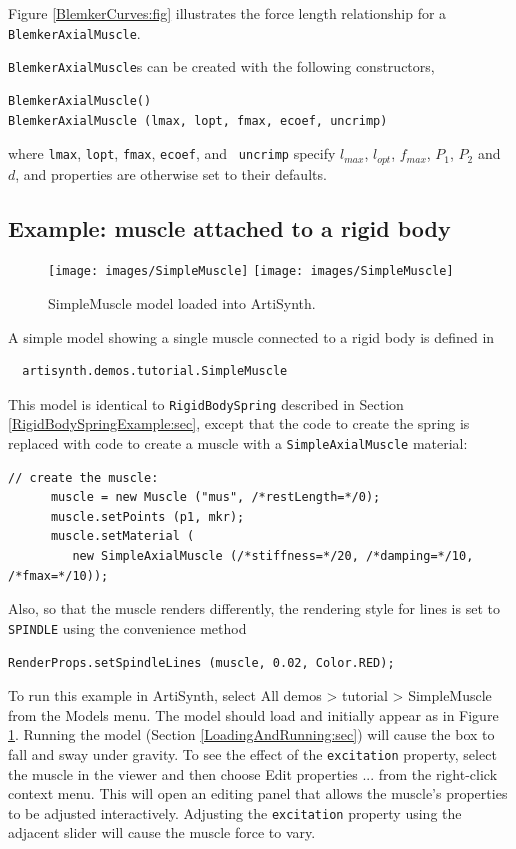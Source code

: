 Figure \ref{BlemkerCurves:fig} illustrates the force length relationship
for a {\tt BlemkerAxialMuscle}. 

{\tt BlemkerAxialMuscle}s can be created with the following 
constructors, 
\begin{lstlisting}[]
BlemkerAxialMuscle()
BlemkerAxialMuscle (lmax, lopt, fmax, ecoef, uncrimp)
\end{lstlisting}
%
where {\tt lmax}, {\tt lopt}, {\tt fmax}, {\tt ecoef}, and {\tt
uncrimp} specify $l_{max}$, $l_{opt}$, $f_{max}$, $P_1$, $P_2$ and
$d$, and properties are otherwise set to their defaults.

\subsection{Example: muscle attached to a rigid body}
\label{SimpleMuscleExample:sec}

\begin{figure}[ht]
\begin{center}
\iflatexml
 \texttt{[image: images/SimpleMuscle]}
\else
 \texttt{[image: images/SimpleMuscle]}
\fi
\end{center}
\caption{SimpleMuscle model loaded into ArtiSynth.}
\label{SimpleMuscle:fig}
\end{figure}

A simple model showing a single muscle connected to a rigid
body is defined in
%
\begin{verbatim}
  artisynth.demos.tutorial.SimpleMuscle
\end{verbatim}
%

This model is identical to {\tt RigidBodySpring} described in Section
\ref{RigidBodySpringExample:sec}, except that the code to create
the spring is replaced with code to create a muscle
with a {\tt SimpleAxialMuscle} material:
%
\begin{lstlisting}[]
      // create the muscle:      
      muscle = new Muscle ("mus", /*restLength=*/0);
      muscle.setPoints (p1, mkr);
      muscle.setMaterial (
         new SimpleAxialMuscle (/*stiffness=*/20, /*damping=*/10, /*fmax=*/10));
\end{lstlisting}
%
Also, so that the muscle renders differently, the rendering style
for lines is set to {\tt SPINDLE} using the convenience method
%
\begin{lstlisting}[]
      RenderProps.setSpindleLines (muscle, 0.02, Color.RED);
\end{lstlisting}
%

To run this example in ArtiSynth, select {\sf All demos > tutorial >
SimpleMuscle} from the {\sf Models} menu. The model should load and
initially appear as in Figure \ref{SimpleMuscle:fig}.  Running the
model (Section \ref{LoadingAndRunning:sec}) will cause the box to fall
and sway under gravity. To see the effect of the {\tt excitation}
property, select the muscle in the viewer and then choose {\sf Edit
properties ...} from the right-click context menu.  This will open an
editing panel that allows the muscle's properties to be adjusted
interactively. Adjusting the {\tt excitation} property using the
adjacent slider will cause the muscle force to vary.

